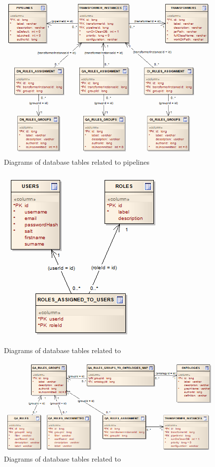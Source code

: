\begin{description}[style=nextline,font=\ttfamily]
\begin{figure}[htbp]
    \centering
    \includegraphics[scale=0.6]{images/db-pipelines.png}
    \caption{Diagrams of database tables related to pipelines}
	\label{fig:dbPipelines}
\end{figure}

\begin{figure}[htbp]
    \centering
    \includegraphics[scale=0.6]{images/db-fe.png}
    \caption{Diagrams of database tables related to \FE}
	\label{fig:dbFrontend}
\end{figure}

\begin{figure}[htbp]
    \centering
    \includegraphics[scale=0.6]{images/db-qa.png}
    \caption{Diagrams of database tables related to \QA}
	\label{fig:dbQA}
\end{figure}


\end{description}
